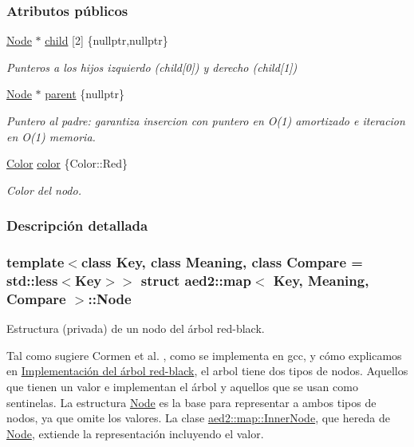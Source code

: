 \subsubsection*{Atributos públicos}
\begin{DoxyCompactItemize}
\item 
\hyperlink{structaed2_1_1map_1_1Node}{Node} $\ast$ \hyperlink{structaed2_1_1map_1_1Node_a7d65c374c73c443a46d8fc224aff9e82_a7d65c374c73c443a46d8fc224aff9e82}{child} \mbox{[}2\mbox{]} \{nullptr,nullptr\}
\begin{DoxyCompactList}\small\item\em Punteros a los hijos izquierdo (child\mbox{[}0\mbox{]}) y derecho (child\mbox{[}1\mbox{]}) \end{DoxyCompactList}\item 
\hyperlink{structaed2_1_1map_1_1Node}{Node} $\ast$ \hyperlink{structaed2_1_1map_1_1Node_ab6a5f9e471b311755e4a56834086cb90_ab6a5f9e471b311755e4a56834086cb90}{parent} \{nullptr\}
\begin{DoxyCompactList}\small\item\em Puntero al padre\+: garantiza insercion con puntero en O(1) amortizado e iteracion en O(1) memoria. \end{DoxyCompactList}\item 
\hyperlink{classaed2_1_1map_a6d62a415a4b9d320b30cada4ebcf9f5b_a6d62a415a4b9d320b30cada4ebcf9f5b}{Color} \hyperlink{structaed2_1_1map_1_1Node_a58dd9993fee8ee3eaa5716b72a3eca47_a58dd9993fee8ee3eaa5716b72a3eca47}{color} \{Color\+::\+Red\}
\begin{DoxyCompactList}\small\item\em Color del nodo. \end{DoxyCompactList}\end{DoxyCompactItemize}


\subsubsection{Descripción detallada}
\subsubsection*{template$<$class Key, class Meaning, class Compare = std\+::less$<$\+Key$>$$>$\newline
struct aed2\+::map$<$ Key, Meaning, Compare $>$\+::\+Node}

Estructura (privada) de un nodo del árbol red-\/black. 

Tal como sugiere Cormen et al. \cite{CormenLeisersonRivestStein2009}, como se implementa en gcc, y cómo explicamos en \hyperlink{Implementacion}{Implementación del árbol red-\/black}, el arbol tiene dos tipos de nodos. Aquellos que tienen un valor e implementan el árbol y aquellos que se usan como sentinelas. La estructura \hyperlink{structaed2_1_1map_1_1Node}{Node} es la base para representar a ambos tipos de nodos, ya que omite los valores. La clase \hyperlink{structaed2_1_1map_1_1InnerNode}{aed2\+::map\+::\+Inner\+Node}, que hereda de \hyperlink{structaed2_1_1map_1_1Node}{Node}, extiende la representación incluyendo el valor.

